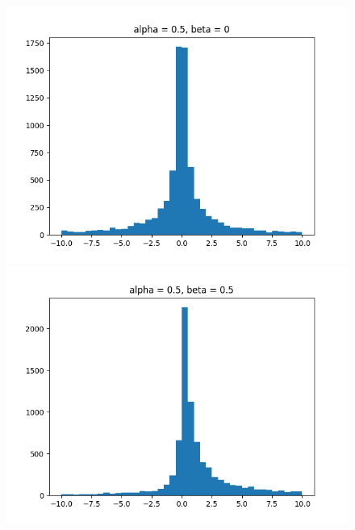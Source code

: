 \documentclass[11pt, twocolumn]{article}
\begin{document}
\begin{figure}[h]
\begin{minipage}{0.2\textwidth}
    \end{minipage}%
    \begin{minipage}{0.2\textwidth}
        \centering
        \includegraphics[width=\textwidth]{q4_1_a0.5_b0}
    \end{minipage}%
    \begin{minipage}{0.2\textwidth}
        \centering
        \includegraphics[width=\textwidth]{q4_1_a0.5_b0.5}
    \end{minipage}%
    \begin{minipage}{0.2\textwidth}
        \centering

\end{minipage}
\end{figure}
\end{document}
